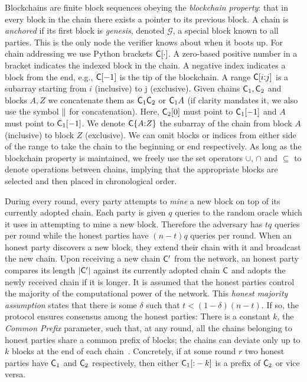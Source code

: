Blockchains are finite block sequences obeying the \emph{blockchain property}:
that in every block in the chain there exists a pointer to its previous block. A
chain is \emph{anchored} if its first block is \emph{genesis}, denoted $\mathcal{G}$,
a special block known to all parties. This is the only node the verifier knows about
when it boots up. For chain addressing we use Python brackets $\mathsf{C}[\cdot]$. A
zero-based positive number in a bracket indicates the indexed block in the
chain. A negative index indicates a block from the end, e.g., $\mathsf{C}[-1]$ is
the tip of the blockchain. A range $\mathsf{C}[i{:}j]$ is a subarray starting from
$i$ (inclusive) to j (exclusive). Given chains $\mathsf{C}_1, \mathsf{C}_2$ and blocks
$A, Z$ we concatenate them as $\mathsf{C}_1 \mathsf{C}_2$ or $\mathsf{C}_1 A$ (if clarity
mandates it, we also use the symbol $\mathbin{\|}$ for concatenation). Here,
$\mathsf{C}_2[0]$ must point to $\mathsf{C}_1[-1]$ and $A$ must point to $\mathsf{C}_1[-1]$.
We denote $\mathsf{C}\{A{:}Z\}$ the subarray of the chain from block $A$ (inclusive) to
block $Z$ (exclusive). We can omit blocks or indices from either side of the range to
take the chain to the beginning or end respectively. As long as the blockchain
property is maintained, we freely use the set operators $\cup$, $\cap$ and
$\subseteq$ to denote operations between chains, implying that the appropriate
blocks are selected and then placed in chronological order.

During every round, every party attempts to \emph{mine} a new block on top of
its currently adopted chain. Each party is given $q$ queries to the random
oracle which it uses in attempting to mine a new block. Therefore the adversary
has $tq$ queries per round while the honest parties have $(n - t)q$ queries per
round. When an honest party discovers a new block, they extend their chain with
it and broadcast the new chain. Upon receiving a new chain $\mathsf{C}'$ from the
network, an honest party compares its length $|\mathsf{C}'|$ against its currently
adopted chain $\mathsf{C}$ and adopts the newly received chain if it is longer. It
is assumed that the honest parties control the majority of the computational
power of the network. This \emph{honest majority assumption} states that there
is some $\delta$ such that $t < (1 -  \delta)(n - t)$. If so, the protocol
ensures consensus among the honest parties: There is a constant $k$, the
\emph{Common Prefix} parameter, such that, at any round, all the chains
belonging to honest parties share a common prefix of blocks; the chains can
deviate only up to $k$ blocks at the end of each chain~\cite{backbone}.
Concretely, if at some round $r$ two honest parties have $\mathsf{C}_1$ and
$\mathsf{C}_2$ respectively, then either $\mathsf{C}_1[{:}-k]$ is a prefix of $\mathsf{C}_2$
or vice versa.

